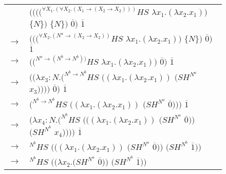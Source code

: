 \begin{figure}
\centering
\begin{tabular}{ll}
\vspace{5pt}

& $((((^{\forall X_{1}.(\forall X_{2}.(X_{1}\rightarrow(X_{2}\rightarrow X_{2})))}HS$ $\lambda x_{1}.(\lambda x_{2}.x_{1}))$ $\lbrace N\rbrace)$ $\lbrace N\rbrace)$ $\overline{0})$ $\overline{1}$ \\

\vspace{5pt}

$\rightarrow$ & $(((^{\forall X_{2}.(N^{a}\rightarrow(X_{2}\rightarrow X_{2}))}HS$ $\lambda x_{1}.(\lambda x_{2}.x_{1}))$ $\lbrace N\rbrace)$ $\overline{0})$ $\overline{1}$ \\

\vspace{5pt}

$\rightarrow$ & $((^{N^{a}\rightarrow(N^{b}\rightarrow N^{b}))}HS$ $\lambda x_{1}.(\lambda x_{2}.x_{1}))$ $\overline{0})$ $\overline{1}$ \\

\vspace{5pt}

$\rightarrow$ & $((\lambda x_{3}:N.(^{N^{b}\rightarrow N^{b}}HS$ $((\lambda x_{1}.(\lambda x_{2}.x_{1}))$ $(SH^{N^{a}}$ $x_{3}))))$ $\overline{0})$ $\overline{1}$ \\

\vspace{5pt}

$\rightarrow$ & $(^{N^{b}\rightarrow N^{b}}HS$ $((\lambda x_{1}.(\lambda x_{2}.x_{1}))$ $(SH^{N^{a}}$ $\overline{0})))$ $\overline{1}$ \\

\vspace{5pt}

$\rightarrow$ & $(\lambda x_{4}:N.(^{N^{b}}HS$ $(((\lambda x_{1}.(\lambda x_{2}.x_{1}))$ $(SH^{N^{a}}$ $\overline{0}))$ $(SH^{N^{b}}$ $x_{4}))))$ $\overline{1}$ \\

\vspace{5pt}

$\rightarrow$ & ${^{N^{b}}H}S$ $(((\lambda x_{1}.(\lambda x_{2}.x_{1}))$ $(SH^{N^{a}}$ $\overline{0}))$ $(SH^{N^{b}}$ $\overline{1}))$ \\

\vspace{5pt}

$\rightarrow$ & ${^{N^{b}}H}S$ $((\lambda x_{2}.(SH^{N^{a}}$ $\overline{0}))$ $(SH^{N^{b}}$ $\overline{1}))$ \\


\end{tabular}
\end{figure}
